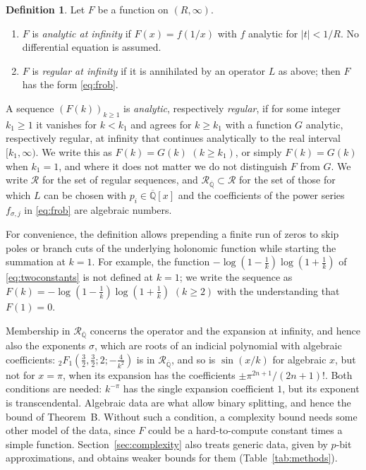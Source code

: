 \documentclass[11pt,reqno]{amsart}
\theoremstyle{definition}
\newtheorem{definition}[theorem]{Definition}
\theoremstyle{remark}
\newcommand{\Qbar}{\overline{\mathbb{Q}}}
\newcommand{\Reg}{\mathcal{R}}
\newcommand{\RegQ}{\mathcal{R}_{\Qbar}}
\begin{document}
\begin{definition}\label{def:regular}
Let $F$ be a function on $(R,\infty)$.
\begin{enumerate}
\item $F$ is \emph{analytic at infinity} if $F(x) = f(1/x)$ with $f$ analytic for $|t| < 1/R$. No differential
equation is assumed.
\item $F$ is \emph{regular at infinity} if it is annihilated by an operator $L$ as above; then $F$ has the form
\eqref{eq:frob}.
\end{enumerate}
A sequence $(F(k))_{k\ge1}$ is \emph{analytic}, respectively \emph{regular}, if for some integer $k_1 \ge 1$ it
vanishes for $k < k_1$ and agrees for $k \ge k_1$ with a function $G$ analytic, respectively regular, at infinity
that continues analytically to the real interval $[k_1,\infty)$. We write this as $F(k) = G(k)$ $(k \ge k_1)$, or
simply $F(k) = G(k)$ when $k_1 = 1$, and where it does not matter we do not distinguish $F$ from $G$.
We write $\Reg$ for the set of regular sequences, and $\RegQ \subset \Reg$ for the set of those for which $L$ can be
chosen with $p_i \in \Qbar[x]$ and the coefficients of the power series $f_{\sigma,j}$ in \eqref{eq:frob} are
algebraic numbers.
\end{definition}

For convenience, the definition allows prepending a finite run of zeros
to skip poles or branch cuts of the underlying holonomic function
while starting the summation at $k = 1$.
For example, the function $-\log(1-\frac1k)\log(1+\frac1k)$ of \eqref{eq:twoconstants} is not
defined at $k = 1$; we write the sequence as $F(k) = -\log(1-\frac1k)\log(1+\frac1k)$ $(k \ge 2)$ with
the understanding that $F(1) = 0$.

Membership in $\RegQ$ concerns the operator and the expansion at infinity, and hence also the exponents $\sigma$,
which are roots of an indicial polynomial with algebraic coefficients: ${}_2F_1(\frac32,\frac32;2;-\frac4{k^2})$ is in $\RegQ$, and so is $\sin(x/k)$
for algebraic $x$, but not for $x = \pi$, when its expansion has the coefficients $\pm\pi^{2n+1}/(2n+1)!$. Both
conditions are needed: $k^{-\pi}$ has the single expansion coefficient $1$, but its exponent is transcendental.
Algebraic data are what allow binary splitting, and hence the bound of Theorem~B. Without such a condition, a
complexity bound needs some other model of the data, since $F$ could be a hard-to-compute constant times a simple
function. Section~\ref{sec:complexity} also treats generic data, given by $p$-bit approximations, and obtains weaker
bounds for them (Table~\ref{tab:methods}).
\end{document}
